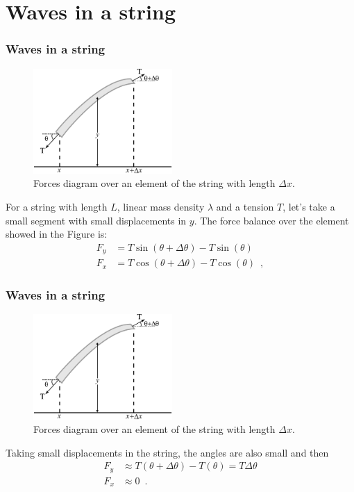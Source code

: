 \documentclass{beamer}
\begin{document}
\section{Waves in a string}
\begin{frame}
	\frametitle{Waves in a string}
	
\begin{figure}[h]
\centering
\includegraphics[height=4cm]{img/string.pdf}
\caption{Forces diagram over an element of the string with length $\Delta x$. }
\end{figure}

For a string with length $L$, linear mass density $\lambda$ and a tension $T$, let's take a small segment with small displacements in $y$. The force balance over the element showed in the Figure is:
\begin{align*}
F_y &= T \sin(\theta + \Delta \theta) - T \sin(\theta)\\
F_x &= T \cos(\theta + \Delta \theta) - T \cos(\theta) \enspace ,
\end{align*}
\end{frame}


\begin{frame}
	\frametitle{Waves in a string}
	
\begin{figure}[h]
\centering
\includegraphics[height=4cm]{img/string.pdf}
\caption{Forces diagram over an element of the string with length $\Delta x$. }
\end{figure}

Taking small displacements in the string, the angles are also small and then
\begin{align*}
F_y &\approx T (\theta + \Delta \theta) - T (\theta) = T \Delta \theta\\
F_x &\approx 0 \enspace .
\end{align*}
\end{frame}
\end{document}
